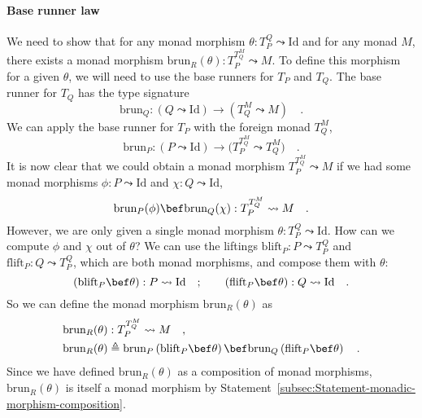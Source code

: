 \paragraph{Base runner law}

We need to show that for any monad morphism $\theta:T_{P}^{Q}\leadsto\text{Id}$
and for any monad $M$, there exists a monad morphism $\text{brun}_{R}(\theta):T_{P}^{T_{Q}^{M}}\leadsto M$.
To define this morphism for a given $\theta$, we will need to use
the base runners for $T_{P}$ and $T_{Q}$. The base runner for $T_{Q}$
has the type signature
\[
\text{brun}_{Q}:\left(Q\leadsto\text{Id}\right)\rightarrow(T_{Q}^{M}\leadsto M)\quad.
\]
We can apply the base runner for $T_{P}$ with the foreign monad $T_{Q}^{M}$,
\[
\text{brun}_{P}:\left(P\leadsto\text{Id}\right)\rightarrow\big(T_{P}^{T_{Q}^{M}}\leadsto T_{Q}^{M}\big)\quad.
\]
It is now clear that we could obtain a monad morphism $T_{P}^{T_{Q}^{M}}\leadsto M$
if we had some monad morphisms $\phi:P\leadsto\text{Id}$ and $\chi:Q\leadsto\text{Id}$,
\[
\text{brun}_{P}(\phi)\bef\text{brun}_{Q}(\chi):T_{P}^{T_{Q}^{M}}\leadsto M\quad.
\]
However, we are only given a single monad morphism $\theta:T_{P}^{Q}\leadsto\text{Id}$.
How can we compute $\phi$ and $\chi$ out of $\theta$? We can use
the liftings $\text{blift}_{P}:P\leadsto T_{P}^{Q}$ and $\text{flift}_{P}:Q\leadsto T_{P}^{Q}$,
which are both monad morphisms, and compose them with $\theta$:
\[
\left(\text{blift}_{P}\bef\theta\right):P\leadsto\text{Id}\quad;\quad\quad\left(\text{flift}_{P}\bef\theta\right):Q\leadsto\text{Id}\quad.
\]
So we can define the monad morphism $\text{brun}_{R}(\theta)$ as
\begin{align*}
\text{brun}_{R}(\theta) & :T_{P}^{T_{Q}^{M}}\leadsto M\quad,\\
\text{brun}_{R}(\theta) & \triangleq\text{brun}_{P}\left(\text{blift}_{P}\bef\theta\right)\bef\text{brun}_{Q}\left(\text{flift}_{P}\bef\theta\right)\quad.
\end{align*}
Since we have defined $\text{brun}_{R}(\theta)$ as a composition
of monad morphisms, $\text{brun}_{R}(\theta)$ is itself a monad morphism
by Statement~\ref{subsec:Statement-monadic-morphism-composition}.

